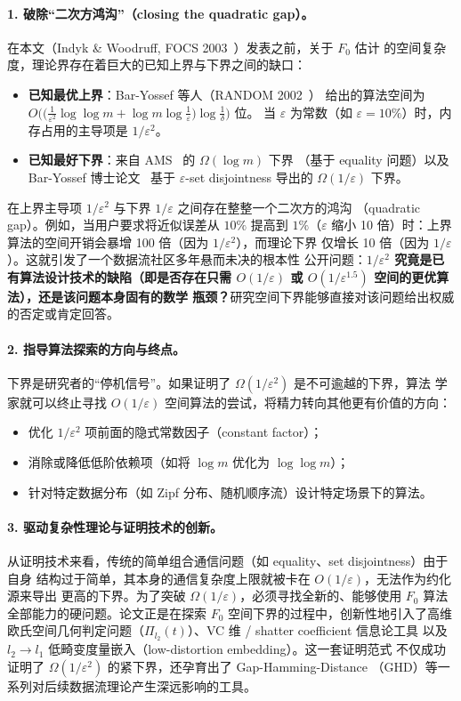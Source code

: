 \documentclass[UTF8, 11pt, a4paper, linestretch=1.15]{ctexart}
\theoremstyle{zhstyle}
\newcommand{\eps}{\varepsilon}
\newcommand{\Fzero}{F_0}
\begin{document}
	\paragraph{1. 破除“二次方鸿沟”（closing the quadratic gap）。}
	在本文（Indyk \& Woodruff, FOCS 2003~\cite{IW03}）发表之前，关于 $\Fzero$ 估计
	的空间复杂度，理论界存在着巨大的已知上界与下界之间的缺口：
	\begin{itemize}
		\item \textbf{已知最优上界}：Bar-Yossef 等人（RANDOM 2002~\cite{BJKST02}）
		给出的算法空间为
		$O\big(\big(\tfrac{1}{\eps^2} \log\log m + \log m \log \tfrac{1}{\eps}\big)
		\log \tfrac{1}{\delta}\big)$ 位。
		当 $\eps$ 为常数（如 $\eps = 10\%$）时，内存占用的主导项是 $1/\eps^2$。
		\item \textbf{已知最好下界}：来自 AMS~\cite{AMS99} 的 $\Omega(\log m)$ 下界
		（基于 equality 问题）以及 Bar-Yossef 博士论文~\cite{BarYossef02} 基于
		$\eps$-set disjointness 导出的 $\Omega(1/\eps)$ 下界。
	\end{itemize}
	
	在上界主导项 $1/\eps^2$ 与下界 $1/\eps$ 之间存在整整一个二次方的鸿沟
	（quadratic gap）。例如，当用户要求将近似误差从 $10\%$ 提高到 $1\%$（$\eps$
	缩小 10 倍）时：上界算法的空间开销会暴增 100 倍（因为 $1/\eps^2$），而理论下界
	仅增长 10 倍（因为 $1/\eps$）。这就引发了一个数据流社区多年悬而未决的根本性
	公开问题：\textbf{$1/\eps^2$ 究竟是已有算法设计技术的缺陷（即是否存在只需
		$O(1/\eps)$ 或 $O(1/\eps^{1.5})$ 空间的更优算法），还是该问题本身固有的数学
		瓶颈？}研究空间下界能够直接对该问题给出权威的否定或肯定回答。
	
	\paragraph{2. 指导算法探索的方向与终点。}
	下界是研究者的“停机信号”。如果证明了 $\Omega(1/\eps^2)$ 是不可逾越的下界，算法
	学家就可以终止寻找 $O(1/\eps)$ 空间算法的尝试，将精力转向其他更有价值的方向：
	\begin{itemize}
		\item 优化 $1/\eps^2$ 项前面的隐式常数因子（constant factor）；
		\item 消除或降低低阶依赖项（如将 $\log m$ 优化为 $\log\log m$）；
		\item 针对特定数据分布（如 Zipf 分布、随机顺序流）设计特定场景下的算法。
	\end{itemize}
	
	\paragraph{3. 驱动复杂性理论与证明技术的创新。}
	从证明技术来看，传统的简单组合通信问题（如 equality、set disjointness）由于自身
	结构过于简单，其本身的通信复杂度上限就被卡在 $O(1/\eps)$，无法作为约化源来导出
	更高的下界。为了突破 $\Omega(1/\eps)$，必须寻找全新的、能够使用 $\Fzero$ 算法
	全部能力的硬问题。论文正是在探索 $\Fzero$ 空间下界的过程中，创新性地引入了高维
	欧氏空间几何判定问题（$\Pi_{l_2}(t)$）、VC 维 / shatter coefficient 信息论工具
	以及 $l_2 \to l_1$ 低畸变度量嵌入（low-distortion embedding）。这一套证明范式
	不仅成功证明了 $\Omega(1/\eps^2)$ 的紧下界，还孕育出了 Gap-Hamming-Distance
	（GHD）等一系列对后续数据流理论产生深远影响的工具。
	
\end{document}
